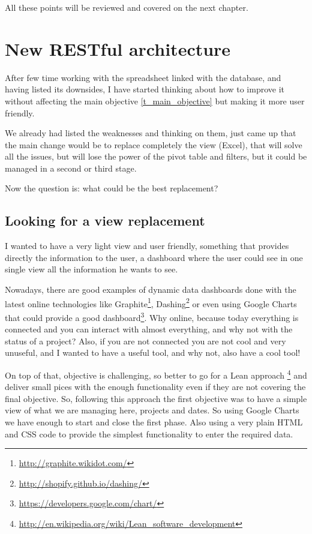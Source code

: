 All these points will be reviewed and covered on the next chapter. 

\chapter{New RESTful architecture}
After few time working with the spreadsheet linked with the database, and having
listed its downsides, I have started thinking about how to improve it without
affecting the main objective \ref{t_main_objective} but making it more
user friendly.

We already had listed the weaknesses and thinking on them, just came
up that the main change would be to replace completely the view (Excel), that
will solve all the issues, but will lose the power of the pivot table and
filters, but it could be managed in a second or third stage.

Now the question is: what could be the best replacement?

\section{Looking for a view replacement}
I wanted to have a very light view and user friendly, something that
provides directly the information to the user, a dashboard where the user could
see in one single view all the information he wants to see.

Nowadays, there are good examples of dynamic data dashboards done with the
latest online technologies like
Graphite\footnote{\url{http://graphite.wikidot.com/}},
Dashing\footnote{\url{http://shopify.github.io/dashing/}} or even using Google
Charts that could provide a good
dashboard\footnote{\url{https://developers.google.com/chart/}}.  Why online,
because today everything is connected and you can interact with almost everything, and
why not with the status of a project? Also, if you are not connected you are
not cool and very unuseful, and I wanted to have a useful tool, and why not,
also have a cool tool!

On top of that, objective is challenging, so better to go for a Lean
approach
\footnote{\url{http://en.wikipedia.org/wiki/Lean\_software\_development}} and
deliver small pices with the enough functionality even if they are not covering the final objective. So, following this approach the first objective was to have
a simple view of what we are managing here, projects and dates. So using Google
Charts we have enough to start and close the first phase. Also using a very
plain HTML and CSS code to provide the simplest functionality to enter the
required data.

